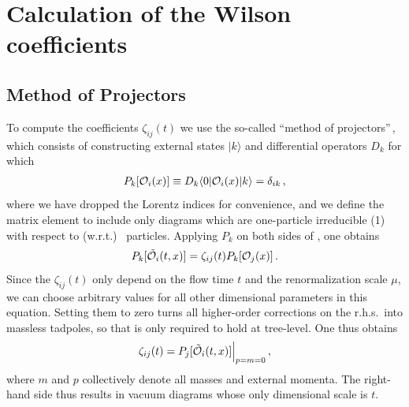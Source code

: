\section{Calculation of the Wilson coefficients}\label{sec:calc}

\subsection{Method of Projectors}

To compute the coefficients $\zeta_{ij}(t)$ we use the so-called
``method of projectors''\,\cite{Gorishnii:1983su,Gorishnii:1986gn},
which consists of constructing external states $|k\rangle$ and differential
operators $D_k$ for which
\begin{equation}
  \begin{split}
    P_{k}[\mathcal{O}_{i} (x) ] \equiv D_{k}\langle
    0|\mathcal{O}_{i} (x) |k\rangle =
    \delta_{ik}\,,
    \label{eq:projectors}
  \end{split}
\end{equation}
where we have dropped the Lorentz indices for convenience, and we define
the matrix element to include only diagrams which are one-particle
irreducible (1) with respect to (w.r.t.)
\qcd\ particles. Applying $P_{k}$ on both sides of , one
obtains
\begin{equation}
  \begin{split}
    P_{k}[\tilde{\mathcal{O}}_{i}(t,x)] =
    \zeta_{ij}(t)P_{k}[\mathcal{O}_{j}(x)]\,.
    \label{eq:project}
  \end{split}
\end{equation}
Since the $\zeta_{ij}(t)$ only depend on the flow time $t$ and the
renormalization scale $\mu$, we can choose arbitrary values for all
other dimensional parameters in this equation. Setting them to zero
turns all higher-order corrections on the r.h.s.\ into massless
tadpoles, so that  is only required to hold at
tree-level.  One thus obtains
\begin{equation}
  \begin{split}
    \zeta_{ij}(t) = P_j[\tilde{\mathcal{O}}_i(t,x)]\Big|_{p=m=0}\,,
  \end{split}
\end{equation}
where $m$ and $p$ collectively denote all masses and external momenta.
The right-hand side thus results in vacuum diagrams whose only dimensional
scale is $t$.

